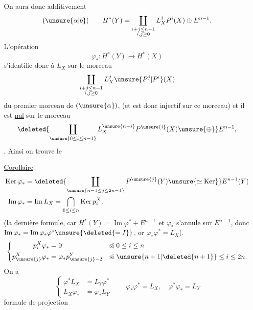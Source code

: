On aura donc additivement
\[
(\unsure{\alpha|b})\qquad H^*(Y)=\coprod_{\substack{i+j\leq n-1\\i,j\geq0}}L_X^jP^i(X)\oplus E^{n-1}.
\]
L'opération
\[\varphi_*:H^*(Y)\longrightarrow H^*(X)\]
s'identifie donc à $L_X$ sur le morceau
\[\coprod_{\substack{i+j\leq n-1\\i,j\geq0}}L_X^j\unsure{P^j|P^i}(X)\]
du premier morceau de $(\unsure{\alpha})$, (et est  donc injectif sur ce morceau) et il est \uline{nul} sur le morceau
\[
\deleted{\coprod_{\unsure{0\leq i\leq n-1}}L_X^{\unsure{n-i}}P^{\unsure{i}}(X)\unsure{\oplus}}E^{n-1},
\]
. Ainsi on trouve le

\uline{Corollaire}
\[
\begin{aligned}
\operatorname{Ker}\varphi_*&=\deleted{\coprod_{\unsure{n-1\leq j\leq2n-1}}P^{\unsure{j}}(Y)\unsure{\simeq\operatorname{Ker}}}E^{n-1}(Y)\\
\operatorname{Im}\varphi_*&=\operatorname{Im}L_X=\bigcap_{0\leq i\leq n}\operatorname{Ker}p_i^X.
\end{aligned}
\]
(la dernière formule, car $H^*(Y)=\operatorname{Im}\varphi^*+E^{n-1}$ et $\varphi_*$ s'annule sur $E^{n-1}$, donc $\operatorname{Im}\varphi_*=\operatorname{Im}\varphi_*\varphi^*\unsure{\deleted{=I}}$, or $\varphi_*\varphi^*=L_X$).
\[
\left\{\begin{aligned}
p_i^X\varphi_*&=0 &&\text{si }0\leq i\leq n\\
p_{\unsure{j}}^X\varphi_*&=\varphi_*p_{\unsure{j}-2}^Y &&\text{si }\unsure{n+1|\deleted{n+1}}\leq i\leq2n.
\end{aligned}\right.
\]
On a
\[
\left\{\begin{aligned}
\varphi^*L_X&=L_Y\varphi^*\\
L_X\varphi_*&=\varphi_*L_Y
\end{aligned}\right.
\qquad
\varphi_*\varphi^*=L_X,\quad\varphi^*\varphi_*=L_Y
\]
formule de projection


